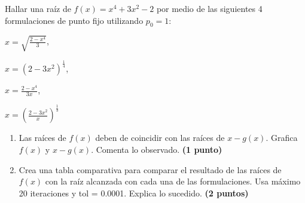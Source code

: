 \documentclass{article}
\theoremstyle{problemstyle}
\begin{document}
\begin{problem}
Hallar una ra\'iz de $ f(x) = x^4 + 3x^2 - 2 $ por medio de las siguientes 4 formulaciones de punto fijo utilizando $ p_0 = 1 $:
\begin{center}
	\begin{enumerate*}[label=\alph*),itemjoin=\qquad]

		\item $\displaystyle x = \sqrt{\frac{2-x^4}{3}} $,
		\item $\displaystyle x = (2-3x^2)^{\frac{1}{4}}$,
		\item $\displaystyle x = \frac{2-x^4}{3x} $,
		\item $\displaystyle x = \left(\frac{2-3x^2}{x}\right)^{\frac{1}{3}}$
	\end{enumerate*}
\end{center}

\begin{enumerate}
	\item Las ra\'ices de $ f(x) $ deben de coincidir con las ra\'ices de $ x-g(x) $. Grafica $ f(x) $ y $ x-g(x) $. Comenta lo observado. \textbf{(1 punto)}

	\item Crea una tabla comparativa para comparar el resultado de las ra\'ices de $f(x) $ con la ra\'iz alcanzada con cada una de las formulaciones. Usa m\'aximo 20 iteraciones y tol = 0.0001. Explica lo sucedido. \textbf{(2 puntos)}
\end{enumerate}
\end{problem}
\end{document}
